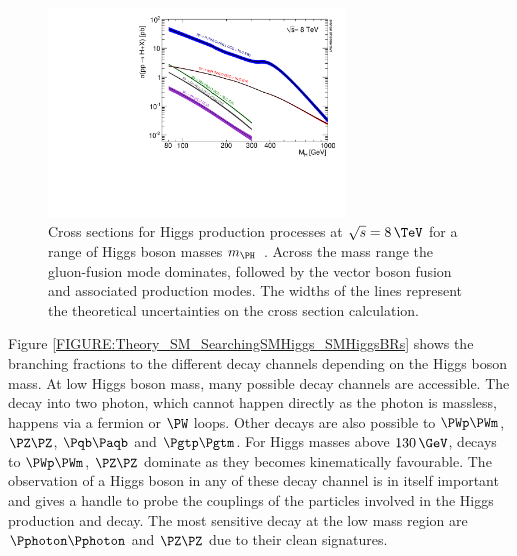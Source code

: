 \begin{figure}[!htb]
 \includegraphics[width=0.7\textwidth]{Chapter01/Images/Higgs_XS_8TeV_lx.pdf}
\caption[Cross sections for Higgs production processes at $\sqrt{s}=8\,\TeV$ for
a range of Higgs boson masses.]{Cross sections for Higgs production processes at
$\sqrt{s}=8\,\TeV$ for a range of Higgs boson masses $m_{\PH}$~\cite{ARTICLE:HandbookofLHCHiggsCrossSectionsHiggsProperties}. Across the
mass range the gluon-fusion mode dominates, followed by the vector boson fusion
and associated production modes. The widths of the lines represent the
theoretical uncertainties on the cross section calculation.}
\label{FIGURE:Theory_SM_SearchingSMHiggs_SMHiggsXS}
\end{figure}

Figure \ref{FIGURE:Theory_SM_SearchingSMHiggs_SMHiggsBRs} shows the branching fractions to the different decay channels depending on the Higgs boson mass. At low Higgs boson mass, many possible decay channels are accessible. The decay into two photon, which cannot happen directly as the photon is massless, happens via a fermion or $\PW$ loops. Other decays are also possible to $\PWp\PWm$, $\PZ\PZ$, $\Pqb\Paqb$ and $\Pgtp\Pgtm$. For Higgs masses above $130\,\GeV$, decays to $\PWp\PWm$, $\PZ\PZ$ dominate as they becomes kinematically favourable. The observation of a Higgs boson in any of these decay channel is in itself important and gives a handle to probe the couplings of the particles involved in the Higgs production and decay. The most sensitive decay at the low mass region are $\Pphoton\Pphoton$ and $\PZ\PZ$ due to their clean signatures.

